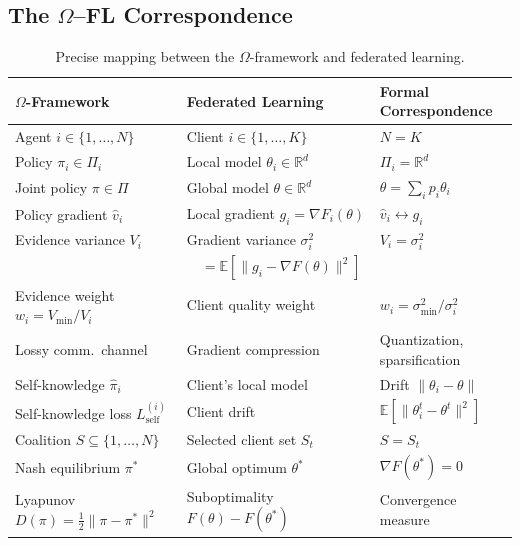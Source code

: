 \documentclass[11pt,a4paper]{article}
\newcommand{\R}{\mathbb{R}}
\newcommand{\E}{\mathbb{E}}
\newcommand{\norm}[1]{\|#1\|}
\begin{document}
\subsection{The $\Omega$--FL Correspondence}

\begin{table}[h]
\centering
\caption{Precise mapping between the $\Omega$-framework and federated learning.}
\label{tab:isomorphism}
\begin{tabular}{@{}lll@{}}
\toprule
\textbf{$\Omega$-Framework} & \textbf{Federated Learning} & \textbf{Formal Correspondence} \\
\midrule
Agent $i \in \{1,\ldots,N\}$ & Client $i \in \{1,\ldots,K\}$ & $N = K$ \\[3pt]
Policy $\pi_i \in \Pi_i$ & Local model $\theta_i \in \R^d$ & $\Pi_i = \R^d$ \\[3pt]
Joint policy $\pi \in \Pi$ & Global model $\theta \in \R^d$ & $\theta = \sum_i p_i \theta_i$ \\[3pt]
Policy gradient $\hat{v}_i$ & Local gradient $g_i = \nabla F_i(\theta)$ & $\hat{v}_i \leftrightarrow g_i$ \\[3pt]
Evidence variance $V_i$ & Gradient variance $\sigma_i^2$ & $V_i = \sigma_i^2$ \\[3pt]
 & ~~$= \E[\norm{g_i - \nabla F(\theta)}^2]$ & \\[3pt]
Evidence weight $w_i = V_{\min}/V_i$ & Client quality weight & $w_i = \sigma_{\min}^2 / \sigma_i^2$ \\[3pt]
Lossy comm.\ channel & Gradient compression & Quantization, sparsification \\[3pt]
Self-knowledge $\hat{\pi}_i$ & Client's local model & Drift $\norm{\theta_i - \theta}$ \\[3pt]
Self-knowledge loss $L_{\text{self}}^{(i)}$ & Client drift & $\E[\norm{\theta_i^t - \theta^t}^2]$ \\[3pt]
Coalition $S \subseteq \{1,\ldots,N\}$ & Selected client set $S_t$ & $S = S_t$ \\[3pt]
Nash equilibrium $\pi^*$ & Global optimum $\theta^*$ & $\nabla F(\theta^*) = 0$ \\[3pt]
Lyapunov $D(\pi) = \frac{1}{2}\norm{\pi - \pi^*}^2$
  & Suboptimality $F(\theta) - F(\theta^*)$ & Convergence measure \\
\bottomrule
\end{tabular}
\end{table}
\end{document}
